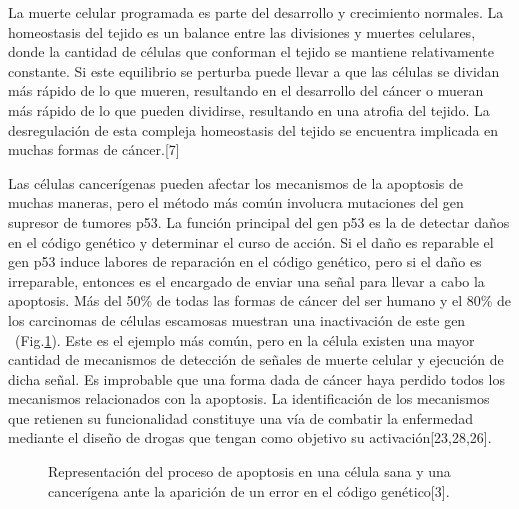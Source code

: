 \hspace{.1cm}La muerte celular programada es parte del desarrollo y crecimiento normales. La homeostasis del tejido es un balance entre las divisiones y muertes celulares, donde la cantidad de células que conforman el tejido se mantiene relativamente constante. Si este equilibrio se perturba puede llevar a que las células se dividan más rápido de lo que mueren, resultando en el desarrollo del cáncer o mueran más rápido de lo que pueden dividirse, resultando en una atrofia del tejido. La desregulación de esta compleja homeostasis del tejido se encuentra implicada en muchas formas de cáncer.[7]

\hspace{.1cm}Las células cancerígenas pueden afectar los mecanismos de la apoptosis de muchas maneras, pero el método más común involucra mutaciones del gen supresor de tumores p53. La función principal del gen p53 es la de detectar daños en el código genético y determinar el curso de acción. Si el daño es reparable el gen p53 induce labores de reparación en el código genético, pero si el daño es irreparable, entonces es el encargado de enviar una señal para llevar a cabo la apoptosis. Más del 50\% de todas las formas de cáncer del ser humano y el 80\% de los carcinomas de células escamosas muestran una inactivación de este gen ~(Fig.\ref{fig-apoptosis}). Este es el ejemplo más común, pero en la célula existen una mayor cantidad de mecanismos de detección de señales de muerte celular y ejecución de dicha señal. Es improbable que una forma dada de cáncer haya perdido todos los mecanismos relacionados con la apoptosis. La identificación de los mecanismos que retienen su funcionalidad constituye una vía de combatir la enfermedad mediante el diseño de drogas que tengan como objetivo su activación[23,28,26].

\begin{figure}[!ht]
\begin{center}
\end{center}\vspace*{-0.6cm}
\caption[Representaci\'on del proceso de apoptosis en una c\'elula sana y una cancer\'igena ante la aparici\'on de un error en el c\'odigo gen\'etico]{Representaci\'on del proceso de apoptosis en una c\'elula sana y una cancer\'igena ante la aparici\'on de un error en el c\'odigo gen\'etico[3].}
\label{fig-apoptosis}
\end{figure}

